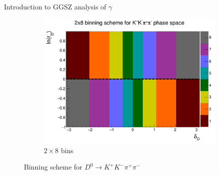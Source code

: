 \documentclass{beamer}
\begin{document}
\begin{frame}{Introduction to GGSZ analysis of $\gamma$}
\begin{figure}
\begin{subfigure}{0.5\textwidth}
      \includegraphics[width=1.0\textwidth]{Plots/BinningSchemePlot_8Bins.png}
      \caption{$2\times 8$ bins}
    \end{subfigure}
    \caption{Binning scheme for $D^0\to K^+K^-\pi^+\pi^-$}
  \end{figure}
\end{frame}
\end{document}
